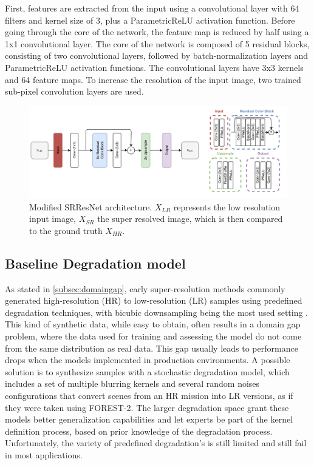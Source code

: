     First, features are extracted from the input using a convolutional layer with 64 filters and kernel size of 3, plus a ParametricReLU activation function.
    Before going through the core of the network, the feature map is reduced by half using a 1x1 convolutional layer.
    The core of the network is composed of 5 residual blocks, consisting of two convolutional layers, followed by batch-normalization layers and ParametricReLU activation functions. 
    The convolutional layers have 3x3 kernels and 64 feature maps. 
    To increase the resolution of the input image, two trained sub-pixel convolution layers are used.

    \begin{figure}[H]
        \centering
        \includegraphics[width=1\textwidth]{includes/3-srresnet-architecture.pdf}
        \caption{ Modified SRResNet architecture. $X_{LR}$ represents the low resolution input image, $X_{SR}$ the super resolved image, which is then compared to the ground truth $X_{HR}$.}
        \label{fig:3-resnet-architecture}
     \end{figure}
    
    \subsection{Baseline Degradation model} \label{subsec:baseline_degradation_model}

        As stated in \ref{subsec:domaingap}, early super-resolution methods commonly generated high-resolution (HR) to low-resolution (LR) samples using predefined degradation techniques, with bicubic downsampling being the most used setting \cite{zhang2018residual}.
        This kind of synthetic data, while easy to obtain, often results in a domain gap problem, where the data used for training and assessing the model do not come from the same distribution as real data.
        This gap usually leads to performance drops when the models implemented in production environments.
        A possible solution is to synthesize samples with a stochastic degradation model, which includes a set of multiple blurring kernels and several random noises configurations that convert scenes from an HR mission into LR versions, as if they were taken using FOREST-2.
        The larger degradation space grant these models better generalization capabilities and let experts be part of the kernel definition process, based on prior knowledge of the degradation process.
        Unfortunately, the variety of predefined degradation's is still limited and still fail in most applications.

